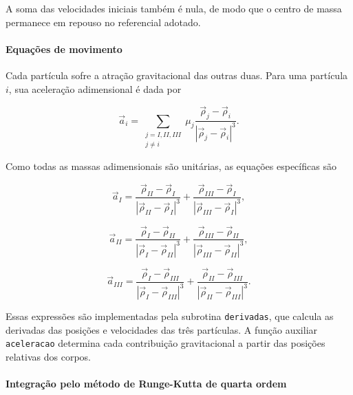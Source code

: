 \documentclass[12pt,a4paper]{article}
\begin{document}
A soma das velocidades iniciais também é nula, de modo que o centro de massa permanece em repouso no referencial adotado.

\paragraph{Equações de movimento}

Cada partícula sofre a atração gravitacional das outras duas. Para uma partícula $i$, sua aceleração adimensional é dada por

\begin{equation}
    \vec{a}_i=
    \sum_{\substack{j=I,II,III\\j\neq i}}
    \mu_j
    \frac{\vec{\rho}_j-\vec{\rho}_i}
    {|\vec{\rho}_j-\vec{\rho}_i|^3}.
\end{equation}

Como todas as massas adimensionais são unitárias, as equações específicas são

\begin{equation}
    \vec{a}_I=
    \frac{\vec{\rho}_{II}-\vec{\rho}_I}
    {|\vec{\rho}_{II}-\vec{\rho}_I|^3}
    +
    \frac{\vec{\rho}_{III}-\vec{\rho}_I}
    {|\vec{\rho}_{III}-\vec{\rho}_I|^3},
\end{equation}

\begin{equation}
    \vec{a}_{II}=
    \frac{\vec{\rho}_I-\vec{\rho}_{II}}
    {|\vec{\rho}_I-\vec{\rho}_{II}|^3}
    +
    \frac{\vec{\rho}_{III}-\vec{\rho}_{II}}
    {|\vec{\rho}_{III}-\vec{\rho}_{II}|^3},
\end{equation}

\begin{equation}
    \vec{a}_{III}=
    \frac{\vec{\rho}_I-\vec{\rho}_{III}}
    {|\vec{\rho}_I-\vec{\rho}_{III}|^3}
    +
    \frac{\vec{\rho}_{II}-\vec{\rho}_{III}}
    {|\vec{\rho}_{II}-\vec{\rho}_{III}|^3}.
\end{equation}

Essas expressões são implementadas pela subrotina \texttt{derivadas}, que calcula as derivadas das posições e velocidades das três partículas. A função auxiliar \texttt{aceleracao} determina cada contribuição gravitacional a partir das posições relativas dos corpos.

\paragraph{Integração pelo método de Runge-Kutta de quarta ordem}
\end{document}
